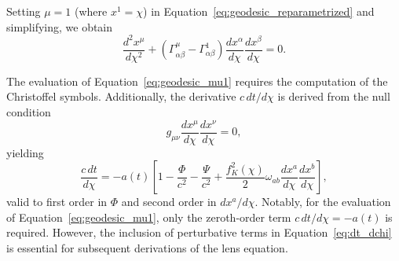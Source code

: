 Setting \( \mu = 1 \) (where \( x^1 = \chi \)) in Equation~\eqref{eq:geodesic_reparametrized} and simplifying, we obtain
\begin{equation}
    \frac{d^2 x^\mu}{d\chi^2} + \left( \Gamma^\mu_{\alpha \beta} - \Gamma^1_{\alpha \beta} \right) \frac{dx^\alpha}{d\chi} \frac{dx^\beta}{d\chi} = 0.
    \label{eq:geodesic_mu1}
\end{equation}

The evaluation of Equation~\eqref{eq:geodesic_mu1} requires the computation of the Christoffel symbols. Additionally, the derivative \( c \, dt / d\chi \) is derived from the null condition
\begin{equation}
    g_{\mu \nu} \frac{dx^\mu}{d\chi} \frac{dx^\nu}{d\chi} = 0,
    \label{eq:null_condition}
\end{equation}
yielding
\begin{equation}
    \frac{c \, dt}{d\chi} = -a(t) \left[ 1 - \frac{\Phi}{c^2} - \frac{\Psi}{c^2} + \frac{f_K^2(\chi)}{2} \omega_{ab} \frac{dx^a}{d\chi} \frac{dx^b}{d\chi} \right],
    \label{eq:dt_dchi}
\end{equation}
valid to first order in \( \Phi \) and second order in \( dx^a / d\chi \). Notably, for the evaluation of Equation~\eqref{eq:geodesic_mu1}, only the zeroth-order term \( c \, dt / d\chi = -a(t) \) is required. However, the inclusion of perturbative terms in Equation~\eqref{eq:dt_dchi} is essential for subsequent derivations of the lens equation.

